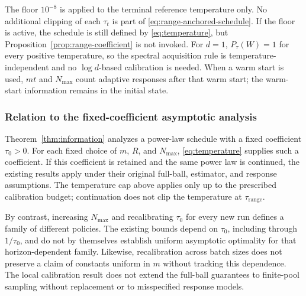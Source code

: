 \documentclass[10pt,twoside,letterpaper]{article}
\begin{document}
The floor $10^{-8}$ is applied to the terminal reference temperature
only. No additional clipping of each $\tau_t$ is part of
\eqref{eq:range-anchored-schedule}. If the floor is active, the
schedule is still defined by \eqref{eq:temperature}, but
Proposition~\ref{prop:range-coefficient} is not invoked.
For $d=1$, $P_\tau(W)=1$ for every positive temperature, so the
spectral acquisition rule is temperature-independent and no
$\log d$-based calibration is needed. When a warm start is used,
$mt$ and $N_{\max}$ count adaptive responses after that warm start;
the warm-start information remains in the initial state.

\subsubsection{Relation to the fixed-coefficient asymptotic analysis}

Theorem~\ref{thm:information} analyzes a power-law schedule with a
fixed coefficient $\tau_0>0$. For each fixed choice of
$m$, $R$, and $N_{\max}$, \eqref{eq:temperature} supplies such a
coefficient. If this coefficient is retained and the same power law
is continued, the existing results apply under their original
full-ball, estimator, and response assumptions. The temperature
cap above applies only up to the prescribed calibration budget;
continuation does not clip the temperature at $\tau_{\mathrm{range}}$.

By contrast, increasing $N_{\max}$ and recalibrating $\tau_0$ for
every new run defines a family of different policies. The existing
bounds depend on $\tau_0$, including through $1/\tau_0$, and do
not by themselves establish uniform asymptotic optimality for that
horizon-dependent family. Likewise, recalibration across batch sizes
does not preserve a claim of constants uniform in $m$ without
tracking this dependence. The local calibration result does not
extend the full-ball guarantees to finite-pool sampling without
replacement or to misspecified response models.
\end{document}

